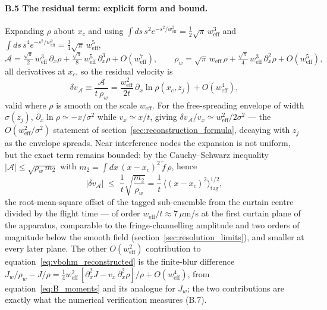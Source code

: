 \documentclass[11pt,a4paper]{article}
\begin{document}
\paragraph{B.5 The residual term: explicit form and bound.} Expanding $\rho$ about $x_c$ and using $\int ds\,s^2 e^{-s^2/w_\text{eff}^2} = \tfrac{1}{2}\sqrt{\pi}\,w_\text{eff}^3$ and $\int ds\,s^4 e^{-s^2/w_\text{eff}^2} = \tfrac{3}{4}\sqrt{\pi}\,w_\text{eff}^5$,
\begin{equation}
\mathcal{A} = \tfrac{\sqrt{\pi}}{2}\,w_\text{eff}^3\,\partial_x\rho + \tfrac{\sqrt{\pi}}{8}\,w_\text{eff}^5\,\partial_x^3\rho + O(w_\text{eff}^7), \qquad
\rho_w = \sqrt{\pi}\,w_\text{eff}\,\rho + \tfrac{\sqrt{\pi}}{4}\,w_\text{eff}^3\,\partial_x^2\rho + O(w_\text{eff}^5),
\label{eq:B_moments}
\end{equation}
all derivatives at $x_c$, so the residual velocity is
\begin{equation}
\delta v_{\mathcal{A}} \equiv \frac{\mathcal{A}}{t\,\rho_w} = \frac{w_\text{eff}^2}{2t}\,\partial_x\ln\rho(x_c, z_j) + O(w_\text{eff}^4),
\label{eq:B_residual}
\end{equation}
valid where $\rho$ is smooth on the scale $w_\text{eff}$. For the free-spreading envelope of width $\sigma(z_j)$, $\partial_x\ln\rho \simeq -x/\sigma^2$ while $v_x \simeq x/t$, giving $\delta v_{\mathcal{A}}/v_x \simeq w_\text{eff}^2/2\sigma^2$ --- the $O(w_\text{eff}^2/\sigma^2)$ statement of section~\ref{sec:reconstruction_formula}, decaying with $z_j$ as the envelope spreads. Near interference nodes the expansion is not uniform, but the exact term remains bounded: by the Cauchy--Schwarz inequality $|\mathcal{A}| \leq \sqrt{\rho_w\,m_2}$ with $m_2 = \int dx\,(x - x_c)^2\,\tilde{f}\,\rho$, hence
\begin{equation}
|\delta v_{\mathcal{A}}| \;\leq\; \frac{1}{t}\sqrt{\frac{m_2}{\rho_w}} = \frac{1}{t}\,\big\langle (x - x_c)^2 \big\rangle_\text{tag}^{1/2},
\label{eq:B_bound}
\end{equation}
the root-mean-square offset of the tagged sub-ensemble from the curtain centre divided by the flight time --- of order $w_\text{eff}/t \approx 7\,\mu$m/s at the first curtain plane of the apparatus, comparable to the fringe-channelling amplitude and two orders of magnitude below the smooth field (section~\ref{sec:resolution_limits}), and smaller at every later plane. The other $O(w_\text{eff}^2)$ contribution to equation~\eqref{eq:vbohm_reconstructed} is the finite-blur difference $J_w/\rho_w - J/\rho = \tfrac{1}{4}w_\text{eff}^2\,[\partial_x^2 J - v_x\,\partial_x^2\rho]/\rho + O(w_\text{eff}^4)$, from equation~\eqref{eq:B_moments} and its analogue for $J_w$; the two contributions are exactly what the numerical verification measures (B.7).
\end{document}
